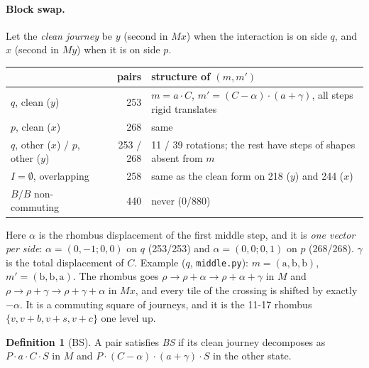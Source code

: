 \documentclass[11pt]{article}
\theoremstyle{definition}\newtheorem{definition}[theorem]{Definition}\newtheorem{remark}[theorem]{Remark}
\begin{document}
\paragraph{Block swap.} Let the \emph{clean journey} be $y$ (second in $Mx$) when the interaction is on side $q$, and $x$ (second in $My$) when it is on side $p$.
\begin{center}\small\begin{tabular}{lrl}\toprule
& pairs & structure of $(m,m')$ \\\midrule
$q$, clean ($y$) & 253 & $m=a\cdot C$, $m'=(C-\alpha)\cdot(a+\gamma)$, all steps rigid translates \\
$p$, clean ($x$) & 268 & same \\
$q$, other ($x$) / $p$, other ($y$) & 253 / 268 & 11 / 39 rotations; the rest have steps of shapes absent from $m$ \\
$I=\emptyset$, overlapping & 258 & same as the clean form on 218 ($y$) and 244 ($x$) \\
$B/B$ non-commuting & 440 & never (0/880)\\\bottomrule
\end{tabular}\end{center}
Here $\alpha$ is the rhombus displacement of the first middle step, and it is \emph{one vector per side}: $\alpha=(0,-1;0,0)$ on $q$ (253/253) and $\alpha=(0,0;0,1)$ on $p$ (268/268).
$\gamma$ is the total displacement of $C$. Example ($q$, \texttt{middle.py}): $m=(\mathrm a,\mathrm b,\mathrm b)$, $m'=(\mathrm b,\mathrm b,\mathrm a)$. The rhombus goes
$\rho\to\rho+\alpha\to\rho+\alpha+\gamma$ in $M$ and $\rho\to\rho+\gamma\to\rho+\gamma+\alpha$ in $Mx$, and every tile of the crossing is shifted by exactly $-\alpha$.
It is a commuting square of journeys, and it is the 11-17 rhombus $\{v,v+b,v+s,v+c\}$ one level up.

\begin{definition}[BS]
A pair satisfies \emph{BS} if its clean journey decomposes as $P\cdot a\cdot C\cdot S$ in $M$ and $P\cdot(C-\alpha)\cdot(a+\gamma)\cdot S$ in the other state.
\end{definition}
\end{document}
